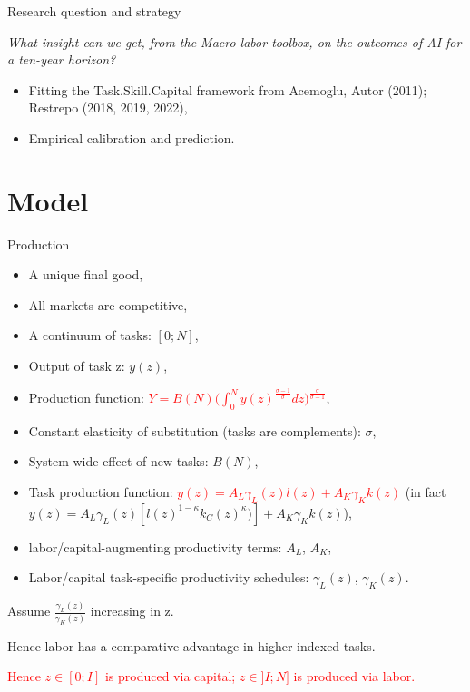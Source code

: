 \documentclass{beamer}
\begin{document}
\begin{frame}{Research question and strategy}

\textit{What insight can we get, from the Macro labor toolbox, on the outcomes of AI for a ten-year horizon?}
\newline
\begin{itemize}
    \item Fitting the Task.Skill.Capital framework from Acemoglu, Autor (2011); Restrepo (2018, 2019, 2022),
    \item Empirical calibration and prediction.
\end{itemize}

\end{frame}

\section{Model}

\begin{frame}{Production}

\begin{itemize}
    \item A unique final good,
    \item All markets are competitive,
    \item A continuum of tasks: \([0;N]\),
    \item Output of task z: \(y(z)\),
    \item Production function: \textcolor{red}{\(Y=B(N)\Big(\int_{0}^{N}y(z)^{\frac{\sigma -1}{\sigma}}dz\Big)^{\frac{\sigma}{\sigma -1}}\)},
    \item Constant elasticity of substitution (tasks are complements): \(\sigma\),
    \item System-wide effect of new tasks: \(B(N)\),
    \item Task production function: \textcolor{red}{\(y(z)=A_L\gamma_L(z)l(z)+A_K\gamma_Kk(z)\)}
    (in fact \(y(z)=A_L\gamma_L(z)[l(z)^{1-\kappa}k_C(z)^\kappa)]+A_K\gamma_Kk(z)\)),
    \item labor/capital-augmenting productivity terms: \(A_L\), \(A_K\),
    \item Labor/capital task-specific productivity schedules: \(\gamma_L(z)\), \(\gamma_K(z)\).
\end{itemize}
Assume \(\frac{\gamma_L(z)}{\gamma_K(z)}\) increasing in z.

Hence labor has a comparative advantage in higher-indexed tasks.

\textcolor{red}{Hence \(z\in[0;I]\) is produced via capital; \(z\in]I;N]\) is produced via labor.}

\end{frame}{}
\end{document}
